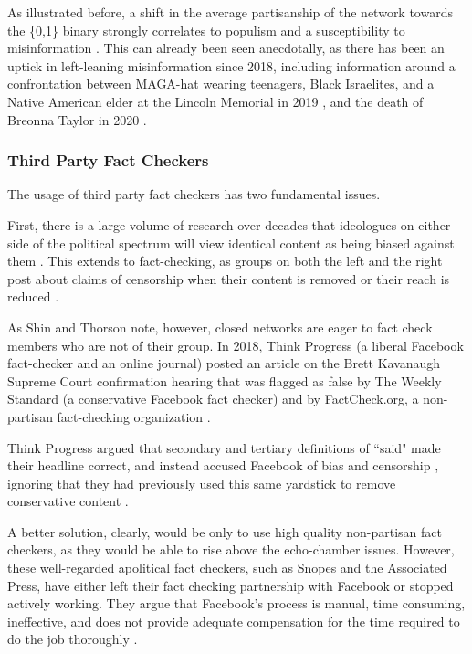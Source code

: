 \documentclass[preprint,review,12pt]{elsarticle}
\begin{document}
 As illustrated before, a shift in the average partisanship of the network towards the \{0,1\} binary strongly correlates to populism and a susceptibility to misinformation \cite{hopp2020people,kahan2012ideology,mourao2019fake,shin2017partisan,swire2017processing,vargo2018agenda}. This can already been seen anecdotally, as there has been an uptick in left-leaning misinformation since 2018, including information around a confrontation between MAGA-hat wearing teenagers, Black Israelites, and a Native American elder at the Lincoln Memorial in 2019 \cite{sacks2019maga,healy2019believing,pond2020complexity}, and the death of Breonna Taylor in 2020 \cite{duvall2020fact,kim2020fact}. 

 \subsubsection{Third Party Fact Checkers}
  \label{Third Party Fact Checkers Sections}
 The usage of third party fact checkers has two fundamental issues.
 
 First, there is a large volume of research over decades that ideologues on either side of the political spectrum will view identical content as being biased against them \cite{arpan2003experimental,baum2008eye,christen2002hostile,gunther2001predicting,gunther2004mapping,baum2004issue,gussin2004eye,lee2005liberal,vallone1985hostile}. This extends to fact-checking, as groups on both the left and the right post about claims of censorship when their content is removed or their reach is reduced \cite{Dreyfuss2020Now,Post2020Facebook,Millhiser2018Facebook}. 
 
 As Shin and Thorson note, however, closed networks are eager to fact check members who are not of their group. In 2018, Think Progress (a liberal Facebook fact-checker and an online journal) posted an article on the Brett Kavanaugh Supreme Court confirmation hearing that was flagged as false by The Weekly Standard (a conservative Facebook fact checker) \cite{lybrand2018kavanaugh} and by FactCheck.org, a non-partisan fact-checking organization \cite{gore2018kavanaugh}. 

Think Progress argued that secondary and tertiary definitions of ``said" made their headline correct, and instead accused Facebook of bias and censorship \cite{legum2018tweet}, ignoring that they had previously used this same yardstick to remove conservative content \cite{legum2008context, volsky2016biden, israel2018rnc, lerner2015cruz}. 
 
A better solution, clearly, would be only to use high quality non-partisan fact checkers, as they would be able to rise above the echo-chamber issues. However, these well-regarded apolitical fact checkers, such as Snopes and the Associated Press, have either left their fact checking partnership with Facebook or stopped actively working. They argue that Facebook's process is manual, time consuming, ineffective, and does not provide adequate compensation for the time required to do the job thoroughly \cite{green2019message,coldeway2019update}. 
\end{document}
